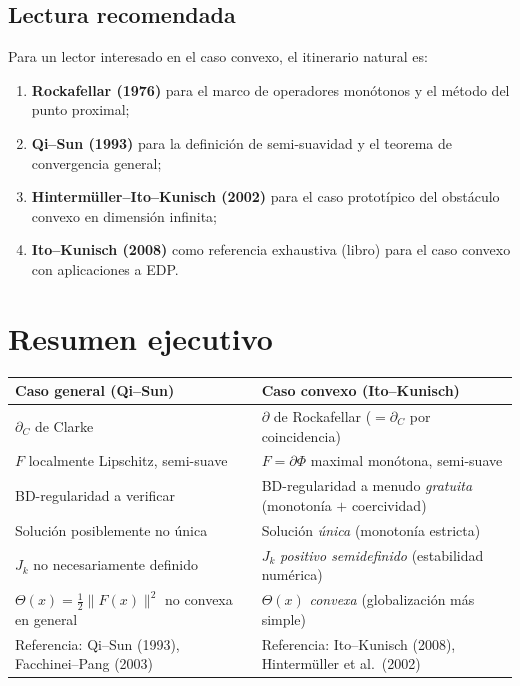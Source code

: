 \documentclass[12pt]{book}
\newcommand{\subdiffC}{\partial_C}
\newcommand{\subdiffR}{\partial}
\theoremstyle{definition}
\theoremstyle{plain}
\theoremstyle{remark}
\begin{document}
\subsection{Lectura recomendada}

Para un lector interesado en el caso convexo, el itinerario natural
es:
\begin{enumerate}[leftmargin=1.4em,itemsep=1pt]
  \item \textbf{Rockafellar (1976)} para el marco de operadores
        monótonos y el método del punto proximal;
  \item \textbf{Qi--Sun (1993)} para la definición de semi-suavidad y
        el teorema de convergencia general;
  \item \textbf{Hintermüller--Ito--Kunisch (2002)} para el caso
        prototípico del obstáculo convexo en dimensión infinita;
  \item \textbf{Ito--Kunisch (2008)} como referencia exhaustiva
        (libro) para el caso convexo con aplicaciones a EDP.
\end{enumerate}

\section{Resumen ejecutivo}

\begin{center}
\renewcommand{\arraystretch}{1.35}
\begin{tabular}{@{}p{} p{}@{}}
\toprule
\textbf{Caso general (Qi--Sun)} & \textbf{Caso convexo (Ito--Kunisch)} \\
\midrule
$\subdiffC$ de Clarke
  & $\subdiffR$ de Rockafellar ($=\subdiffC$ por coincidencia) \\
$F$ localmente Lipschitz, semi-suave
  & $F=\subdiffR\Phi$ maximal monótona, semi-suave \\
BD-regularidad a verificar
  & BD-regularidad a menudo \emph{gratuita} (monotonía $+$ coercividad) \\
Solución posiblemente no única
  & Solución \emph{única} (monotonía estricta) \\
$J_k$ no necesariamente definido
  & $J_k$ \emph{positivo semidefinido} (estabilidad numérica) \\
$\Theta(x)=\tfrac12\|F(x)\|^2$ no convexa en general
  & $\Theta(x)$ \emph{convexa} (globalización más simple) \\
Referencia: Qi--Sun (1993), Facchinei--Pang (2003)
  & Referencia: Ito--Kunisch (2008), Hintermüller et al.\ (2002) \\
\bottomrule
\end{tabular}
\end{center}
\end{document}
